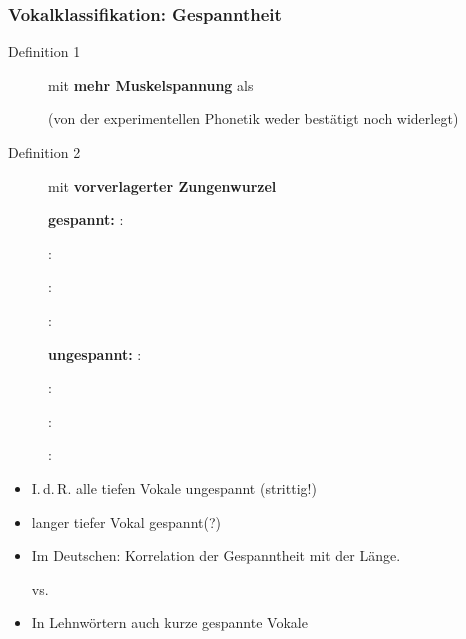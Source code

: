 \begin{frame}
\frametitle{Vokalklassifikation: Gespanntheit}

\begin{description}
	\item[Definition 1] \textipa{[ i:, y:, u:, o: ]} mit \textbf{mehr Muskelspannung} als \textipa{[ i:, y:, u:, o: ]} 
	
	(von der experimentellen Phonetik weder bestätigt noch widerlegt)
	
	\item[Definition 2] \textipa{[ i:, y:, u:, o: ]}  mit \textbf{vorverlagerter Zungenwurzel}


	\begin{multicols}{2}

	\textbf{gespannt:}
			\ea \textipa{[ i: ]}: 
			
			\ex \textipa{[ y: ]}: 
			
			\ex \textipa{[ u: ]}: 
			
			\ex \textipa{[ o: ]}: 
			
			\z 
		
\columnbreak
		
		\textbf{ungespannt:}
			\ea \textipa{[ I ]}: 
			
			\ex \textipa{[ Y ]}: 
			
			\ex \textipa{[ U ]}: 
			
			\ex \textipa{[ O ]}: 
			
			\z
		
	\end{multicols}

\end{description}
			
\end{frame}		

			
\begin{frame}			
		\begin{itemize}	
			\item I.\,d.\,R. alle tiefen Vokale \ras ungespannt (strittig!)
			\item langer tiefer Vokal \textipa{[ a: ]} \ras gespannt(?)

	      \item Im Deutschen: Korrelation der Gespanntheit mit der Länge.

		\ea \textipa{[ m i: t @ ]} vs. \textipa{[ m I t @ ]}
		\z

		\item In Lehnwörtern auch kurze gespannte Vokale

		\ea \textipa{[ P i . d e: ]}
		\z
		
	\end{itemize}
	
\end{frame}


